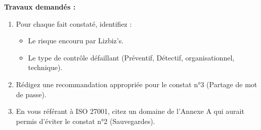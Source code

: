 \textbf{Travaux demandés :}

\begin{enumerate}
    \item Pour chaque fait constaté, identifiez :
    \begin{itemize}
        \item Le risque encouru par Lizbiz's.
        \item Le type de contrôle défaillant (Préventif, Détectif, organisationnel, technique).
    \end{itemize}
    \item Rédigez une recommandation appropriée pour le constat n°3 (Partage de mot de passe).
    \item En vous référant à ISO 27001, citez un domaine de l'Annexe A qui aurait permis d'éviter le constat n°2 (Sauvegardes).
\end{enumerate}
